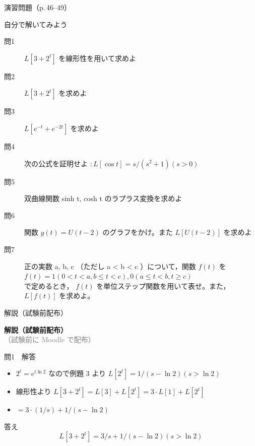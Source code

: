 \documentclass[aspectratio=43,professionalfonts,handout]{beamer}
\begin{document}
\begin{frame}{演習問題（p.\,46--49）}
  \begin{exampleblock}{自分で解いてみよう}
  \begin{description}
    \item[問1] $L[3 + 2^t]$ を線形性を用いて求めよ
    \item[問2] $L[3 + 2^t]$ を求めよ
    \item[問3] $L[e^{-t} + e^{-2t}]$ を求めよ
    \item[問4] 次の公式を証明せよ $: L[\cos t] = s/(s^{2}+1) (s > 0)$
    \item[問5] 双曲線関数 sinh t, cosh t のラプラス変換を求めよ
    \item[問6] 関数 $g(t) = U(t-2)$ のグラフをかけ。また $L[U(t-2)]$ を求めよ
    \item[問7] 正の実数 a, b, c （ただし a < b < c ）について，関数 $f(t)$ を
    $f(t) = { 1  (0 < t < a, b \leq t < c),  0  (a \leq t < b, t \geq c) }$\\
    で定めるとき， $f(t)$ を単位ステップ関数を用いて表せ。また， $L[f(t)]$ を求めよ。\\
  \end{description}
  \end{exampleblock}
\end{frame}

\begin{frame}{解説（試験前配布）}
  \vfill
  \begin{center}
  {\LARGE\bfseries\color{structure.fg} 解説（試験前配布）}\\[1em]
  {\normalsize\textcolor{gray}{（試験前に Moodle で配布）}}
  \end{center}
  \vfill
\end{frame}

\begin{frame}{問1　解答}
  \begin{block}{}
  \begin{itemize}\setlength{\itemsep}{2pt}
    \item $2^t = e^{t \ln 2}$ なので例題 3 より $L[2^t] = 1/(s - \ln 2) (s > \ln 2)$
    \item 線形性より $L[3 + 2^t] = L[3] + L[2^t] = 3\cdot L[1] + L[2^t]$
    \item $= 3\cdot(1/s) + 1/(s - \ln 2)$
  \end{itemize}
  \end{block}
  \begin{exampleblock}{答え}
    \[
    L[3 + 2^t] = 3/s + 1/(s - \ln 2)  (s > \ln 2)
  \]
  \end{exampleblock}
\end{frame}
\end{document}
